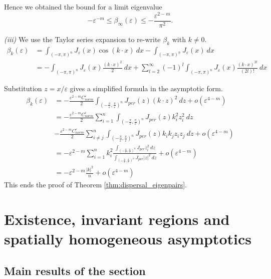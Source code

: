 \documentclass[12pt, a4paper]{article}
\theoremstyle{break}
\theoremstyle{break}
\theoremstyle{break}
\theoremstyle{break}
\theoremstyle{break}
\begin{document}
Hence we obtained the bound for a limit eigenvalue
\begin{equation*}
    -\varepsilon^{-m} \leq \beta_\infty(\varepsilon) \leq -\frac{\varepsilon^{2-m}}{\pi^2}.
\end{equation*}

\textit{(iii)} We use the Taylor series expansion to re-write $\beta_k$ with $k \neq 0$.
\begin{align*}
    \beta_k(\varepsilon)
    &= \int_{(-\pi, \pi)^n} J_\varepsilon(x)\cos(k\cdot x)\:dx - \int_{(-\pi, \pi)^n} J_\varepsilon(x)\:dx \\
    &= - \int_{(-\pi, \pi)^n} J_\varepsilon(x) \frac{(k\cdot x)^2}{2}\: dx + \sum_{l=2}^\infty (-1)^l \int_{(-\pi, \pi)^n} J_\varepsilon(x)\frac{(k\cdot x)^{2l}}{(2l)!}\:dx
\end{align*}

Substitution $z = x / \varepsilon$ gives a simplified formula in the asymptotic form.
\begin{align*}
    \beta_k(\varepsilon)   &= -\frac{\varepsilon^{2-m} C_{norm}^\varepsilon}{2} \int_{\left(-\frac{\pi}{\varepsilon}, \frac{\pi}{\varepsilon}\right)^n} J_{per}(z) (k \cdot z)^2 \:dz + o(\varepsilon^{4-m}) \\
    &= -\frac{\varepsilon^{2-m} C_{norm}^\varepsilon}{2} \sum_{i=1}^n \int_{\left(-\frac{\pi}{\varepsilon}, \frac{\pi}{\varepsilon}\right)^n} J_{per}(z) k_i^2z_i^2 \:dz\\
    &-\frac{\varepsilon^{2-m} C_{norm}^\varepsilon}{2} \sum_{i\neq j}^n \int_{\left(-\frac{\pi}{\varepsilon}, \frac{\pi}{\varepsilon}\right)^n} J_{per}(z) k_ik_jz_iz_j \:dz + o(\varepsilon^{4-m})\\
    &= - \varepsilon^{2-m} \sum_{i=1}^n k_{i}^2 \frac{\int_{\left(-\frac{\pi}{\varepsilon}, \frac{\pi}{\varepsilon}\right)^n} J_{per} z_i^2\:dz}{\int_{\left(-\frac{\pi}{\varepsilon}, \frac{\pi}{\varepsilon}\right)^n} J_{per} |z|^2\:dz} + o(\varepsilon^{4-m}) \\
    &=  - \varepsilon^{2-m}\frac{|k|^2}{n}  + o(\varepsilon^{4-m})
\end{align*}
This ends the proof of Theorem \ref{thm:dispersal_eigenpairs}.

\section{Existence, invariant regions and spatially homogeneous asymptotics} \label{sec:existence_invariant_regions_homo_asymptotics}

\subsection{Main results of the section}
\end{document}
